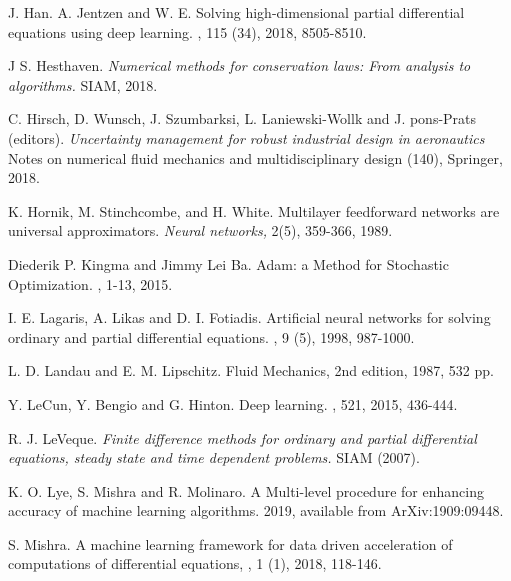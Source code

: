 \documentclass[a4paper]{article}
\numberwithin{equation}{section}
\numberwithin{equation}{section}
\theoremstyle{definition}
\theoremstyle{myremarkstyle}
\begin{document}
\begin{thebibliography}{99}
J. Han. A. Jentzen and W. E.
\newblock Solving high-dimensional partial differential equations using deep learning.
, 115 (34), 2018, 8505-8510.

 J S. Hesthaven.
\newblock \emph{Numerical methods for conservation laws: From analysis to algorithms.}
\newblock SIAM, 2018.

 C. Hirsch, D. Wunsch, J. Szumbarksi, L. Laniewski-Wollk and J. pons-Prats (editors).
\newblock \emph{Uncertainty management for robust industrial design in aeronautics}
\newblock Notes on numerical fluid mechanics and multidisciplinary design (140), Springer, 2018.



K. Hornik, M. Stinchcombe, and H. White. 
\newblock Multilayer feedforward networks are universal
approximators.
\newblock \emph{ Neural networks,} 2(5), 359-366, 1989.

 Diederik P. Kingma and Jimmy Lei Ba. 
\newblock Adam: a Method for Stochastic Optimization. 
, 1-13, 2015.

I. E. Lagaris, A. Likas and D. I. Fotiadis.
\newblock Artificial neural networks for solving ordinary and partial differential equations.
, 9 (5), 1998, 987-1000.



L. D. Landau and E. M. Lipschitz.
\newblock Fluid Mechanics, 2nd edition,
 1987, 532 pp.

Y. LeCun, Y. Bengio and G. Hinton.
\newblock Deep learning.
, 521, 2015, 436-444.


 R. J. LeVeque.
\newblock \emph{Finite difference methods for ordinary and partial differential equations, steady state and time dependent problems.}
\newblock SIAM (2007).

 K. O. Lye, S. Mishra and R. Molinaro.
\newblock A Multi-level procedure for enhancing accuracy of machine learning algorithms.
 2019, available from ArXiv:1909:09448.

S. Mishra.  
\newblock A machine learning framework for data driven acceleration of computations of differential equations, 
, 1 (1), 2018, 118-146. 


\end{thebibliography}
\end{document}
